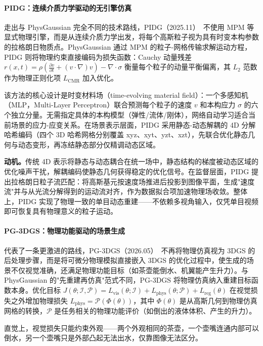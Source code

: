 \paragraph{PIDG：连续介质力学驱动的无引擎仿真}

走出与 PhysGaussian 完全不同的技术路线，PIDG（2025.11）~\cite{2511_06299}不使用 MPM 等显式物理引擎，而是从连续介质力学出发，将每个高斯粒子视为具有时变本构参数的拉格朗日物质点。PhysGaussian 通过 MPM 的粒子-网格传输求解运动方程，PIDG 则将物理约束直接编码为损失函数：Cauchy 动量残差 $r(x,t) = \rho(\frac{\partial v}{\partial t} + (v \cdot \nabla)v) - \nabla \cdot \sigma$ 衡量每个粒子的动量平衡偏离，其 $L_2$ 范数作为物理正则化项 $L_{\text{CMR}}$ 加入优化。

该方法的核心设计是时变材料场（time-evolving material field）：一个多感知机（MLP，Multi-Layer Perceptron）联合预测每个粒子的速度 $v$ 和本构应力 $\sigma$ 的六个独立分量。无需指定具体的本构模型（弹性/流体/刚体），网络自动学习适合当前场景的应力-应变关系。在场景表示层面，PIDG 采用静态-动态解耦的 4D 分解哈希编码（四个 3D 哈希网格分别覆盖 xyz、xyt、yzt、xzt），先联合优化静态几何与动态变形，再冻结静态部分仅精调动态区域。

\textbf{动机。}传统 4D 表示将静态与动态耦合在统一场中，静态结构的梯度被动态区域的优化噪声干扰，解耦编码使静态几何获得稳定的优化信号。在监督层面，PIDG 提出拉格朗日粒子流匹配：将高斯基元按速度场推进后投影到图像平面，生成"速度流"并与从光流分解得到的运动流对齐，作为数据拟合项加速物理场收敛。整体上，PIDG 实现了物理一致的单目动态重建——不依赖多视角输入，仅凭单目视频即可恢复具有物理意义的粒子运动。

\paragraph{PG-3DGS：物理功能驱动的场景生成}

代表了一条更激进的路线，PG-3DGS（2026.05）~\cite{2605_11266}不再将物理仿真视为 3DGS 的后处理步骤，而是将可微分物理模拟直接嵌入 3DGS 的优化过程中，使生成的场景不仅视觉准确，还满足物理功能目标（如茶壶能倒水、机翼能产生升力）。与 PhysGaussian 的"先重建再仿真"范式不同，PG-3DGS 将物理仿真纳入重建目标函数本身。优化目标 $J(\theta; \mathcal{I}, \mathcal{P}) = L_{\text{vis}}(\theta; \mathcal{I}) + L_{\text{phys}}(\theta; \mathcal{P}) + L_{\text{reg}}(\theta)$ 在视觉损失之外增加物理损失 $L_{\text{phys}} = \mathcal{P}(\Phi(\theta))$，其中 $\Phi(\theta)$ 是从高斯几何到物理仿真网格的转换，$\mathcal{P}$ 是任务相关的物理功能评价（如倒出的液体体积、产生的升力）。

直觉上，视觉损失只能约束外观——两个外观相同的茶壶，一个壶嘴连通内部可以倒水，另一个壶嘴只是外部凸起无法出水，仅靠图像无法区分。

